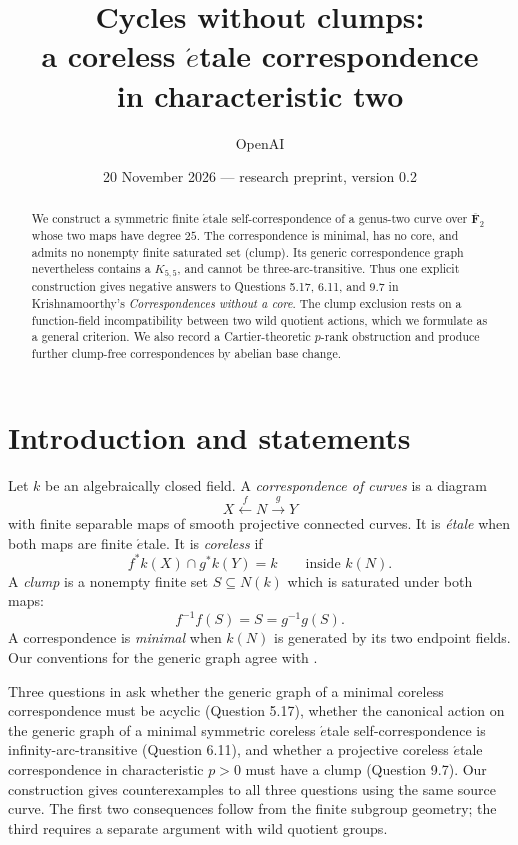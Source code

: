 \documentclass[11pt,a4paper,reqno]{amsart}
\title[Cycles without clumps]{Cycles without clumps:\\ a coreless \texorpdfstring{$\acute{e}$}{e}tale correspondence\\ in characteristic two}
\author{OpenAI}
\date{20 November 2026 --- research preprint, version 0.2}
\newcommand{\FF}{\mathbf F}
\begin{document}
\begin{abstract}
We construct a symmetric finite \(\acute{e}\)tale self-correspondence of a
genus-two curve over $\overline{\FF}_2$ whose two maps have
degree $25$. The correspondence is minimal, has no core, and admits no
nonempty finite saturated set (clump). Its generic correspondence graph
nevertheless contains a $K_{5,5}$, and cannot be three-arc-transitive.
Thus one explicit construction gives negative answers to Questions
5.17, 6.11, and 9.7 in Krishnamoorthy's \emph{Correspondences without a
core}. The clump exclusion rests on a function-field incompatibility
between two wild quotient actions, which we formulate as a general
criterion. We also record a Cartier-theoretic $p$-rank obstruction and
produce further clump-free correspondences by abelian base change.
\end{abstract}
\maketitle

\section{Introduction and statements}
Let $k$ be an algebraically closed field. A \emph{correspondence of curves}
is a diagram
\begin{equation}\label{eq:correspondence}
  X\xleftarrow{\ f\ }N\xrightarrow{\ g\ }Y
\end{equation}
with finite separable maps of smooth projective connected curves. It is
\emph{\'{e}tale} when both maps are finite \(\acute{e}\)tale. It is
\emph{coreless} if
\[
  f^*k(X)\cap g^*k(Y)=k\qquad\text{inside }k(N).
\]
A \emph{clump} is a nonempty finite set $S\subseteq N(k)$ which is
saturated under both maps:
\[
   f^{-1}f(S)=S=g^{-1}g(S).
\]
A correspondence is \emph{minimal} when $k(N)$ is generated by its two
endpoint fields. Our conventions for the generic graph agree with
\cite[\S5]{Kri18}.

Three questions in \cite{Kri18} ask whether the generic graph of a
minimal coreless correspondence must be acyclic (Question 5.17), whether
the canonical action on the generic graph of a minimal symmetric coreless
\(\acute{e}\)tale self-correspondence is infinity-arc-transitive
(Question 6.11), and whether a projective coreless
\(\acute{e}\)tale correspondence in characteristic $p>0$ must have a
clump (Question 9.7).  Our construction gives counterexamples to all three questions
using the same source curve.  The first two consequences follow from
the finite subgroup geometry; the third requires a separate argument
with wild quotient groups.
\end{document}
